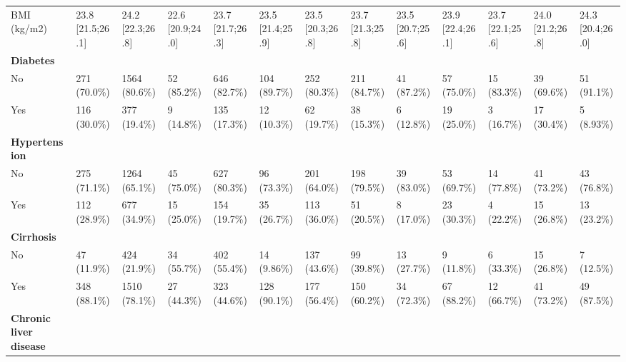 \documentclass{article}
\begin{document}
\begin{landscape}
\begin{tiny}
\begin{tabularx}{\linewidth}{p{4.5cm}|X|X|X|X|X|X|X|X|X|X|X|X}
\rowcolor{gray!10}
BMI (kg/m2) & 23.8 [21.5;26.1] & 24.2 [22.3;26.8] & 22.6 [20.9;24.0] & 23.7 [21.7;26.3] & 23.5 [21.4;25.9] & 23.5 [20.3;26.8] & 23.7 [21.3;25.8] & 23.5 [20.7;25.6] & 23.9 [22.4;26.1] & 23.7 [22.1;25.6] & 24.0 [21.2;26.8] & 24.3 [20.4;26.0] \\
\rowcolor{gray!30}
\textbf{Diabetes }  &  &  &  &  &  &  &  &  &  &  &  &  \\
\rowcolor{gray!10}
    No &   271 (70.0\%)    &   1564 (80.6\%)   &    52 (85.2\%)    &   646 (82.7\%)    &   104 (89.7\%)    &   252 (80.3\%)    &   211 (84.7\%)    &    41 (87.2\%)    &    57 (75.0\%)    &    15 (83.3\%)    &    39 (69.6\%)    &    51 (91.1\%)    \\
\rowcolor{gray!10}
    Yes &   116 (30.0\%)    &   377 (19.4\%)    &    9 (14.8\%)     &   135 (17.3\%)    &    12 (10.3\%)    &    62 (19.7\%)    &    38 (15.3\%)    &    6 (12.8\%)     &    19 (25.0\%)    &    3 (16.7\%)     &    17 (30.4\%)    &    5 (8.93\%)     \\
\rowcolor{gray!30}
\textbf{Hypertension }  &  &  &  &  &  &  &  &  &  &  &  &  \\
\rowcolor{gray!10}
    No &   275 (71.1\%)    &   1264 (65.1\%)   &    45 (75.0\%)    &   627 (80.3\%)    &    96 (73.3\%)    &   201 (64.0\%)    &   198 (79.5\%)    &    39 (83.0\%)    &    53 (69.7\%)    &    14 (77.8\%)    &    41 (73.2\%)    &    43 (76.8\%)    \\
\rowcolor{gray!10}
    Yes &   112 (28.9\%)    &   677 (34.9\%)    &    15 (25.0\%)    &   154 (19.7\%)    &    35 (26.7\%)    &   113 (36.0\%)    &    51 (20.5\%)    &    8 (17.0\%)     &    23 (30.3\%)    &    4 (22.2\%)     &    15 (26.8\%)    &    13 (23.2\%)    \\
\rowcolor{gray!30}
\textbf{Cirrhosis }  &  &  &  &  &  &  &  &  &  &  &  &  \\
\rowcolor{gray!10}
    No &    47 (11.9\%)    &   424 (21.9\%)    &    34 (55.7\%)    &   402 (55.4\%)    &    14 (9.86\%)    &   137 (43.6\%)    &    99 (39.8\%)    &    13 (27.7\%)    &    9 (11.8\%)     &    6 (33.3\%)     &    15 (26.8\%)    &    7 (12.5\%)     \\
\rowcolor{gray!10}
    Yes &   348 (88.1\%)    &   1510 (78.1\%)   &    27 (44.3\%)    &   323 (44.6\%)    &   128 (90.1\%)    &   177 (56.4\%)    &   150 (60.2\%)    &    34 (72.3\%)    &    67 (88.2\%)    &    12 (66.7\%)    &    41 (73.2\%)    &    49 (87.5\%)    \\
\rowcolor{gray!30}
\textbf{Chronic liver disease }  &  &  &  &  &  &  &  &  &  &  &  &  \\

\end{tabularx}
\end{tiny}
\end{landscape}
\end{document}
